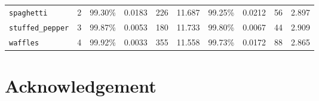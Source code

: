 \documentclass[10pt]{article}
\makeatletter
\newcommand\backmatter{%
  \if@openright
    \cleardoublepage
  \else
    \clearpage
  \fi
   }
\makeatother
\begin{document}
\begin{table}[htb]
{{\begin{tabularx}{\linewidth}{ l | r | r r r r | r r r r }
							\texttt{spaghetti} & 2 & 99.30\% & 0.0183 & 226 & 11.687 & 99.25\% & 0.0212 & 56 & 2.897 \\
							\texttt{stuffed\_pepper} & 3 & 99.87\% & 0.0053 & 180 & 11.733 & 99.80\% & 0.0067 & 44 & 2.909 \\
							\texttt{waffles} & 4 & 99.92\% & 0.0033 & 355 & 11.558 & 99.73\% & 0.0172 & 88 & 2.865 \\
						\end{tabularx}
					}
				}
				\label{tbl:table_binary_classification_overview}
			\end{table}
		
		
		
		
	\pagebreak
	\backmatter
	\section*{Acknowledgement}
		\thispagestyle{empty}
		
\end{document}
